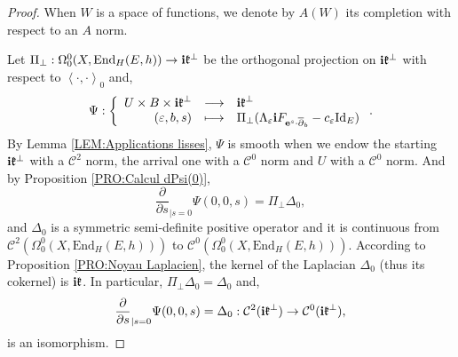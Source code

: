 \documentclass{article}
\theoremstyle{remark}
\theoremstyle{definition}
\newcommand{\End}{\mathrm{End}}
\newcommand{\Id}{\mathrm{Id}}
\renewcommand{\i}{\boldsymbol{\mathrm{i}}}
\newcommand{\e}{\boldsymbol{\mathrm{e}}}
\newcommand{\scal}[2]{\left< #1,#2 \right>}
\newcommand{\dbar}{\overline{\partial}}
\newcommand{\mC}{\mathcal{C}}
\newcommand{\fonction}[4]{\left\{ \begin{array}{rcl}
		\displaystyle #1 & \longrightarrow & \displaystyle #2\\
		\displaystyle #3 & \longmapsto & \displaystyle #4
	\end{array} \right.}
\begin{document}
\begin{proof}
When $W$ is a space of functions, we denote by $A(W)$ its completion with respect to an $A$ norm.

Let $\Pi_\bot : \Omega_0^0(X,\End_H(E,h)) \rightarrow \i\frak{k}^\bot$ be the orthogonal projection on $\i\frak{k}^\bot$ with respect to $\scal{\cdot}{\cdot}_0$ and,
$$
\Psi : \fonction{U \times B \times \i\frak{k}^\bot}{\i\frak{k}^\bot}{(\varepsilon,b,s)}{\Pi_\bot(\Lambda_\varepsilon\i F_{\e^s \cdot \dbar_b} - c_\varepsilon\Id_E)}.
$$
By Lemma \ref{LEM:Applications lisses}, $\Psi$ is smooth when we endow the starting $\i\frak{k}^\bot$ with a $\mC^2$ norm, the arrival one with a $\mC^0$ norm and $U$ with a $\mC^0$ norm. And by Proposition \ref{PRO:Calcul dPsi(0)},
$$
\frac{\partial}{\partial s}_{|s = 0}\Psi(0,0,s) = \Pi_\bot\Delta_0,
$$
and $\Delta_0$ is a symmetric semi-definite positive operator and it is continuous from $\mC^2(\Omega_0^0(X,\End_H(E,h)))$ to $\mC^0(\Omega_0^0(X,\End_H(E,h)))$. According to Proposition \ref{PRO:Noyau Laplacien}, the kernel of the Laplacian $\Delta_0$ (thus its cokernel) is $\i\frak{k}$. In particular, $\Pi_\bot\Delta_0 = \Delta_0$ and,
$$
\frac{\partial}{\partial s}_{|s = 0}\Psi(0,0,s) = \Delta_0 : \mC^2(\i\frak{k}^\bot) \rightarrow \mC^0(\i\frak{k}^\bot),
$$
is an isomorphism.


\end{proof}
\end{document}
